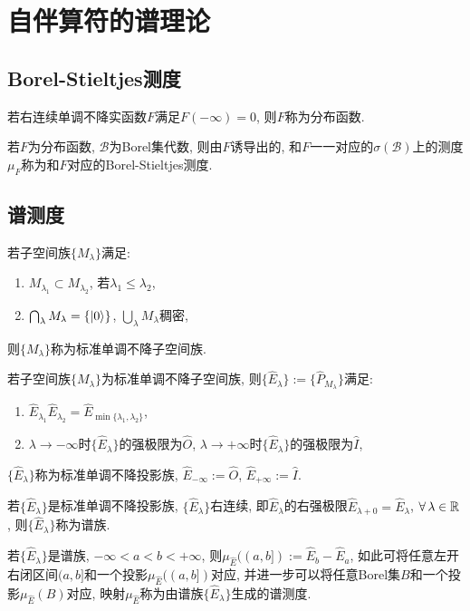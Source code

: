 \chapter{自伴算符的谱理论}

\section{Borel-Stieltjes测度}

\begin{definition}
    若右连续单调不降实函数$F$满足$F(-\infty)=0$, 则$F$称为分布函数.
\end{definition}
\begin{definition}
    若$F$为分布函数, $\mathcal{B}$为Borel集代数, 则由$F$诱导出的, 和$F$一一对应的$\sigma(\mathcal{B})$上的测度$\mu_F$称为和$F$对应的Borel-Stieltjes测度.
\end{definition}

\section{谱测度}

\begin{definition}
    若子空间族$\{M_\lambda\}$满足:
    \begin{enumerate}
        \item $M_{\lambda_1}\subset M_{\lambda_2}$, 若$\lambda_1\le\lambda_2$,
        \item $\bigcap_\lambda M_\lambda=\{|0\rangle\}$, $\bigcup_\lambda M_\lambda$稠密,
    \end{enumerate}
    则$\{M_\lambda\}$称为标准单调不降子空间族.
\end{definition}
\begin{definition}
    若子空间族$\{M_\lambda\}$为标准单调不降子空间族, 则$\{\hat{E}_\lambda\}:=\{\hat{P}_{M_\lambda}\}$满足:
    \begin{enumerate}
        \item $\hat{E}_{\lambda_1}\hat{E}_{\lambda_2}=\hat{E}_{\min\{\lambda_1,\lambda_2\}}$,
        \item $\lambda\to-\infty$时$\{\hat{E}_\lambda\}$的强极限为$\hat{O}$, $\lambda\to+\infty$时$\{\hat{E}_\lambda\}$的强极限为$\hat{I}$,
    \end{enumerate}
    $\{\hat{E}_\lambda\}$称为标准单调不降投影族, $\hat{E}_{-\infty}:=\hat{O}$, $\hat{E}_{+\infty}:=\hat{I}$.
\end{definition}
\begin{definition}
    若$\{\hat{E}_\lambda\}$是标准单调不降投影族, $\{\hat{E}_\lambda\}$右连续, 即$\hat{E}_\lambda$的右强极限$\hat{E}_{\lambda+0}=\hat{E}_\lambda$, $\forall\,\lambda\in\mathbb{R}$, 则$\{\hat{E}_\lambda\}$称为谱族.
\end{definition}
\begin{definition}
    若$\{\hat{E}_\lambda\}$是谱族, $-\infty<a<b<+\infty$, 则$\mu_{\hat{E}}((a,b]):=\hat{E}_b-\hat{E}_a$, 如此可将任意左开右闭区间$(a,b]$和一个投影$\mu_{\hat{E}}((a,b])$对应, 并进一步可以将任意Borel集$B$和一个投影$\mu_{\hat{E}}(B)$对应, 映射$\mu_{\hat{E}}$称为由谱族$\{\hat{E}_\lambda\}$生成的谱测度.
\end{definition}

